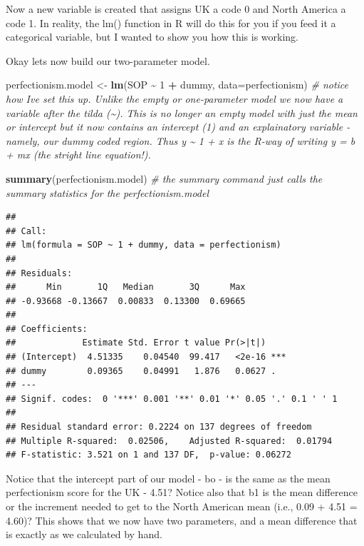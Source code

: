 \documentclass[
]{article}
\newenvironment{Shaded}{\begin{snugshade}}{\end{snugshade}}
\newcommand{\AttributeTok}[1]{\textcolor[rgb]{0.13,0.29,0.53}{#1}}
\newcommand{\CommentTok}[1]{\textcolor[rgb]{0.56,0.35,0.01}{\textit{#1}}}
\newcommand{\DecValTok}[1]{\textcolor[rgb]{0.00,0.00,0.81}{#1}}
\newcommand{\FunctionTok}[1]{\textcolor[rgb]{0.13,0.29,0.53}{\textbf{#1}}}
\newcommand{\NormalTok}[1]{#1}
\newcommand{\OtherTok}[1]{\textcolor[rgb]{0.56,0.35,0.01}{#1}}
\newcommand{\SpecialCharTok}[1]{\textcolor[rgb]{0.81,0.36,0.00}{\textbf{#1}}}
\begin{document}
Now a new variable is created that assigns UK a code 0 and North America
a code 1. In reality, the lm() function in R will do this for you if you
feed it a categorical variable, but I wanted to show you how this is
working.

Okay lets now build our two-parameter model.

\begin{Shaded}
\begin{Highlighting}[]
\NormalTok{perfectionism.model }\OtherTok{\textless{}{-}} \FunctionTok{lm}\NormalTok{(SOP }\SpecialCharTok{\textasciitilde{}} \DecValTok{1} \SpecialCharTok{+}\NormalTok{ dummy, }\AttributeTok{data=}\NormalTok{perfectionism) }\CommentTok{\# notice how I\textquotesingle{}ve set this up. Unlike the empty or one{-}parameter model we now have a variable after the tilda (\textasciitilde{}). This is no longer an empty model with just the mean or intercept but it now contains an intercept (1) and an explainatory variable {-} namely, our dummy coded region. Thus y \textasciitilde{} 1 + x is the R{-}way of writing y = b + mx (the stright line equation!).}

\FunctionTok{summary}\NormalTok{(perfectionism.model) }\CommentTok{\# the summary command just calls the summary statistics for the perfectionism.model}
\end{Highlighting}
\end{Shaded}

\begin{verbatim}
## 
## Call:
## lm(formula = SOP ~ 1 + dummy, data = perfectionism)
## 
## Residuals:
##      Min       1Q   Median       3Q      Max 
## -0.93668 -0.13667  0.00833  0.13300  0.69665 
## 
## Coefficients:
##             Estimate Std. Error t value Pr(>|t|)    
## (Intercept)  4.51335    0.04540  99.417   <2e-16 ***
## dummy        0.09365    0.04991   1.876   0.0627 .  
## ---
## Signif. codes:  0 '***' 0.001 '**' 0.01 '*' 0.05 '.' 0.1 ' ' 1
## 
## Residual standard error: 0.2224 on 137 degrees of freedom
## Multiple R-squared:  0.02506,    Adjusted R-squared:  0.01794 
## F-statistic: 3.521 on 1 and 137 DF,  p-value: 0.06272
\end{verbatim}

Notice that the intercept part of our model - bo - is the same as the
mean perfectionism score for the UK - 4.51? Notice also that b1 is the
mean difference or the increment needed to get to the North American
mean (i.e., 0.09 + 4.51 = 4.60)? This shows that we now have two
parameters, and a mean difference that is exactly as we calculated by
hand.
\end{document}
